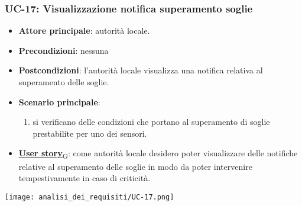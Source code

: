 \subsubsection{UC-17: Visualizzazione notifica superamento soglie}
\begin{itemize}
	\item \textbf{Attore principale}: autorità locale.
	\item \textbf{Precondizioni}: nessuna
	\item \textbf{Postcondizioni}: l'autorità locale visualizza una notifica relativa al superamento delle soglie.
	\item \textbf{Scenario principale}:
	      \begin{enumerate}
		      \item si verificano delle condizioni che portano al superamento di soglie prestabilite per uno dei sensori.
	      \end{enumerate}
	\item \href{https://7last.github.io/docs/pb/documentazione-interna/glossario\#user-story}{\textbf{User story}\textsubscript{G}}:
	      come autorità locale desidero poter visualizzare delle notifiche relative al superamento delle soglie in modo da poter intervenire tempestivamente in caso di criticità.
\end{itemize}
\begin{center}
	\texttt{[image: analisi\_dei\_requisiti/UC-17.png]}
\end{center}

\newpage
